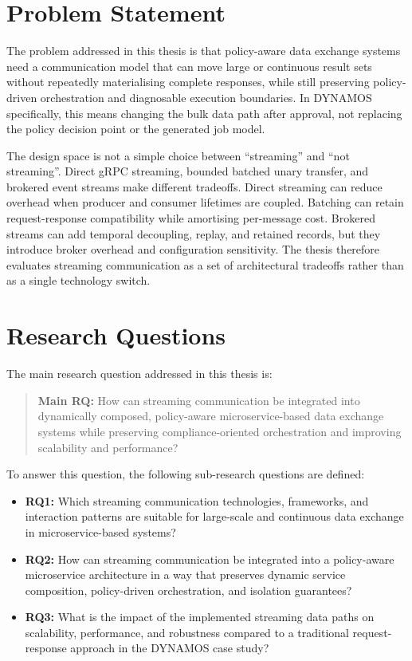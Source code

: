 \section{Problem Statement}

The problem addressed in this thesis is that policy-aware data exchange systems need a communication model that can move large or continuous result sets without repeatedly materialising complete responses, while still preserving policy-driven orchestration and diagnosable execution boundaries. In DYNAMOS specifically, this means changing the bulk data path after approval, not replacing the policy decision point or the generated job model.

The design space is not a simple choice between ``streaming'' and ``not streaming''. Direct gRPC streaming, bounded batched unary transfer, and brokered event streams make different tradeoffs. Direct streaming can reduce overhead when producer and consumer lifetimes are coupled. Batching can retain request-response compatibility while amortising per-message cost. Brokered streams can add temporal decoupling, replay, and retained records, but they introduce broker overhead and configuration sensitivity. The thesis therefore evaluates streaming communication as a set of architectural tradeoffs rather than as a single technology switch.

\section{Research Questions}

The main research question addressed in this thesis is:

\begin{quote}
\textbf{Main RQ:} How can streaming communication be integrated into dynamically composed, policy-aware microservice-based data exchange systems while preserving compliance-oriented orchestration and improving scalability and performance?
\end{quote}

To answer this question, the following sub-research questions are defined:

\begin{itemize}
  \item \textbf{RQ1:} Which streaming communication technologies, frameworks, and interaction patterns are suitable for large-scale and continuous data exchange in microservice-based systems?
  \item \textbf{RQ2:} How can streaming communication be integrated into a policy-aware microservice architecture in a way that preserves dynamic service composition, policy-driven orchestration, and isolation guarantees?
  \item \textbf{RQ3:} What is the impact of the implemented streaming data paths on scalability, performance, and robustness compared to a traditional request-response approach in the DYNAMOS case study?
\end{itemize}

